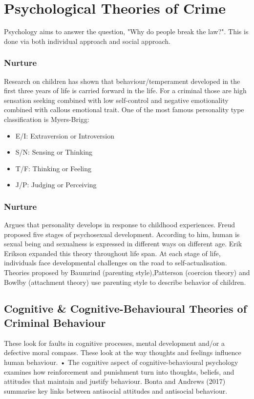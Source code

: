 \documentclass[11pt]{article}
\begin{document}
\section{Psychological Theories of Crime}

Psychology aims to answer the question, "Why do people break the law?". This is done via both individual approach and social approach. 

\subsubsection*{Nurture}

Research on children has shown that behaviour/temperament developed in the first three years of life is carried forward in the life. For a criminal those are high sensation seeking  combined with low self-control and negative emotionality combined with callous emotional trait. One of the most famous personality type classification is Myers-Brigg:
\begin{itemize}
    \item E/I: Extraversion or Introversion
    \item S/N: Sensing or Thinking
    \item T/F: Thinking or Feeling
    \item J/P: Judging or Perceiving
\end{itemize}

\subsubsection*{Nurture}

Argues that personality develops in response to childhood experiences. Freud proposed five stages of psychosexual development. According to him, human is sexual being and sexualness is expressed in different ways on different age. Erik Erikson expanded this theory throughout life span. At each stage of life, individuals face developmental challenges on the road to self-actualisation. Theories proposed by Baumrind (parenting style),Patterson (coercion theory) and Bowlby (attachment theory) use parenting style to describe behavior of children.

\subsection{Cognitive \& Cognitive-Behavioural Theories of Criminal Behaviour}

These look for faults in cognitive processes, mental development and/or a defective moral compass. These look at the way thoughts and feelings influence human behaviour. 	• The cognitive aspect of cognitive-behavioural psychology examines how reinforcement and punishment turn into thoughts, beliefs, and attitudes that maintain and justify behaviour. Bonta and Andrews (2017) summarise key links between antisocial attitudes and antisocial behaviour.
\end{document}
